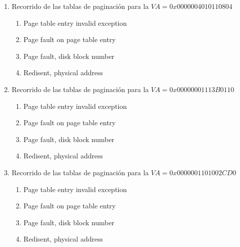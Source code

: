 \begin{enumerate}
	\begin{enumerate}
	\item Recorrido de las tablas de paginación para la $VA = 0x0000004010110804$
	      \begin{enumerate}
	      \item Page table entry invalid exception
	      \item Page fault on page table entry
	      \item Page fault, disk block number \underline{$\qquad\qquad\qquad$}
	      \item Redisent, physical address \underline{$\qquad\qquad\qquad$}
	      \end{enumerate}
	\item Recorrido de las tablas de paginación para la $VA = 0x00000001113B0110$
	      \begin{enumerate}
	      \item Page table entry invalid exception
	      \item Page fault on page table entry
	      \item Page fault, disk block number \underline{$\qquad\qquad\qquad$}
	      \item Redisent, physical address \underline{$\qquad\qquad\qquad$}
	      \end{enumerate}
	\item Recorrido de las tablas de paginación para la $VA = 0x0000001101002CD0$
	      \begin{enumerate}
	      \item Page table entry invalid exception
	      \item Page fault on page table entry
	      \item Page fault, disk block number \underline{$\qquad\qquad\qquad$}
	      \item Redisent, physical address \underline{$\qquad\qquad\qquad$}
	      \end{enumerate}
	\end{enumerate}
\begin{figure}[h]
	\centering

\end{figure}
\end{enumerate}
